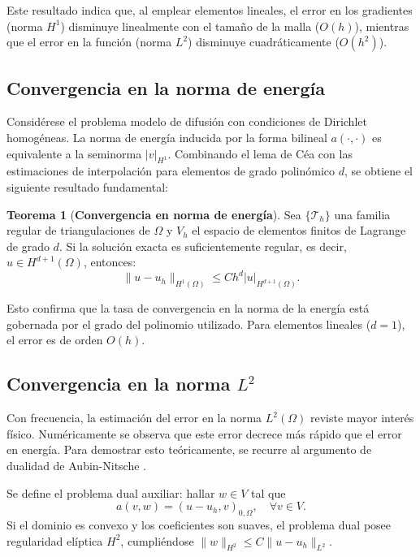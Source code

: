 \documentclass[12pt, letterpaper]{report}
\theoremstyle{definition}
\newtheorem{teorema}{Teorema}[chapter]
\begin{document}
Este resultado indica que, al emplear elementos lineales, el error en los gradientes (norma $H^1$) disminuye linealmente con el tamaño de la malla ($O(h)$), mientras que el error en la función (norma $L^2$) disminuye cuadráticamente ($O(h^2)$).

\subsection{Convergencia en la norma de energía}

Considérese el problema modelo de difusión con condiciones de Dirichlet homogéneas. La norma de energía inducida por la forma bilineal $a(\cdot,\cdot)$ es equivalente a la seminorma $|v|_{H^1}$. Combinando el lema de Céa con las estimaciones de interpolación para elementos de grado polinómico $d$, se obtiene el siguiente resultado fundamental:

\begin{teorema}[\textbf{Convergencia en norma de energía}]
    Sea $\{\mathcal{T}_h\}$ una familia regular de triangulaciones de $\Omega$ y $V_h$ el espacio de elementos finitos de Lagrange de grado $d$. Si la solución exacta es suficientemente regular, es decir, $u \in H^{d+1}(\Omega)$, entonces:
    \begin{equation}
        \|u - u_h\|_{H^1(\Omega)} \leq C h^d |u|_{H^{d+1}(\Omega)}.
    \end{equation}
\end{teorema}

Esto confirma que la tasa de convergencia en la norma de la energía está gobernada por el grado del polinomio utilizado. Para elementos lineales ($d=1$), el error es de orden $O(h)$.

\subsection{Convergencia en la norma $L^2$}

Con frecuencia, la estimación del error en la norma $L^2(\Omega)$ reviste mayor interés físico. Numéricamente se observa que este error decrece más rápido que el error en energía. Para demostrar esto teóricamente, se recurre al argumento de dualidad de Aubin-Nitsche \cite{ciarlet2002finite}.

Se define el problema dual auxiliar: hallar $w \in V$ tal que
\begin{equation}\label{eq:dual}
    a(v, w) = (u - u_h, v)_{0,\Omega}, \quad \forall v \in V.
\end{equation}
Si el dominio es convexo y los coeficientes son suaves, el problema dual posee regularidad elíptica $H^2$, cumpliéndose $\|w\|_{H^2} \leq C \|u - u_h\|_{L^2}$.
\end{document}
